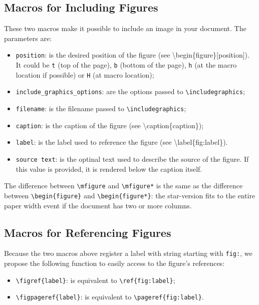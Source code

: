 \documentclass[book,taskpackage,specpackage,codepackage]{upmethodology-document}
\begin{document}
\subsection{Macros for Including Figures}

These two macros make it possible to include an image in your document. The parameters are:
\begin{itemize}
\item \texttt{position}: is the desired position of the figure (see {\textbackslash}begin\{figure\}[position]). It could be \texttt{t} (top of the page), \texttt{b} (bottom of the page), \texttt{h} (at the macro location if possible) or \texttt{H} (at macro location);

\item \texttt{include\_graphics\_options}: are the options passed to \texttt{{\textbackslash}includegraphics};

\item \texttt{filename}: is the filename passed to \texttt{{\textbackslash}includegraphics};

\item \texttt{caption}: is the caption of the figure (see {\textbackslash}caption\{caption\});

\item \texttt{label}: is the label used to reference the figure (see {\textbackslash}label\{fig:label\}).

\item \texttt{source text}: is the optinal text used to describe the source of the figure. If this value is provided, it is rendered below the caption itself.
\end{itemize}

The difference between \texttt{{\textbackslash}mfigure} and \texttt{{\textbackslash}mfigure*} is the same as the difference between \texttt{{\textbackslash}begin\{figure\}} and \texttt{{\textbackslash}begin\{figure*\}}: the star-version fits to the entire paper width event if the document has two or more columns.

\subsection{Macros for Referencing Figures}

Because the two macros above register a label with string starting with \texttt{fig:}, we propose the following function to easily access to the figure's references:
\begin{itemize}
\item \texttt{{\textbackslash}figref\{label\}}: is equivalent to \texttt{{\textbackslash}ref\{fig:label\}};
\item \texttt{{\textbackslash}figpageref\{label\}}: is equivalent to \texttt{{\textbackslash}pageref\{fig:label\}}.
\end{itemize}
\end{document}
